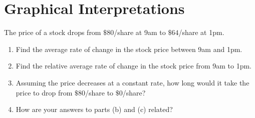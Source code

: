 \documentclass{ximera}
\begin{document}
\section{Graphical Interpretations}

\begin{question} \label{Qdpf3mmz}
The price of a stock drops from $\$80$/share at 9am to $\$64$/share at 1pm.

\begin{enumerate}
\item Find the average rate of change in the stock price between 9am and 1pm. 

\item Find the relative average rate of change in the stock price from 9am to 1pm.

\item Assuming the price decreases at a constant rate, how long would it take the price to drop from $\$80$/share to $\$0$/share?

\item How are your answers to parts (b) and (c) related?
\end{enumerate}

\end{question}
\end{document}
